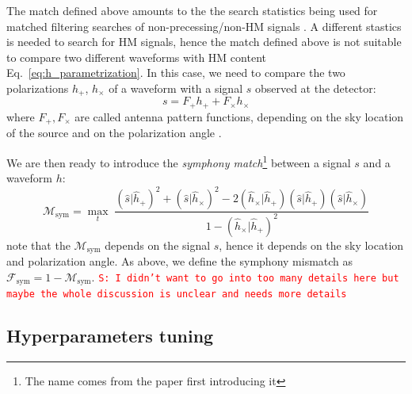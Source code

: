 \documentclass[twocolumn,showpacs,preprintnumbers,nofootinbib,prd,
superscriptaddress,10pt]{revtex4-1}
\newcommand{\rescalar}[2]{( #1 |#2 )}
\newcommand{\stefano}[1]{{\textcolor{red}{\texttt{S: #1}} }}
\begin{document}
The match defined above amounts to the the search statistics being used for matched filtering searches of non-precessing/non-HM signals \cite{}.
A different stastics is needed to search for HM signals, hence the match defined above is not suitable to compare two different waveforms with HM content Eq.~\eqref{eq:h_parametrization}.
In this case, we need to compare the two polarizations $h_+$, $h_\times$ of a waveform with a signal $s$ observed at the detector:
\begin{equation}
	s = F_+ h_+ + F_\times h_\times
\end{equation}
where $F_+, F_\times$ are called antenna pattern functions, depending on the sky location of the source and on the polarization angle \cite{}.

We are then ready to introduce the {\it symphony match}\footnote{The name comes from the paper \cite{} first introducing it} between a signal $s$ and a waveform $h$:
\begin{equation}\label{eq:match_sym}
	\mathcal{M}_\mathrm{sym} = \max_t \;
		\frac{ \rescalar{\hat{s}}{\hat{h}_+}^2 + \rescalar{\hat{s}}{\hat{h}_\times}^2 - 2 \rescalar{\hat{h}_\times}{\hat{h}_+} \rescalar{\hat{s}}{\hat{h}_+} \rescalar{\hat{s}}{\hat{h}_\times}}
		{1-\rescalar{\hat{h}_\times}{\hat{h}_+}^2}
\end{equation}
note that the $\mathcal{M}_\mathrm{sym}$ depends on the signal $s$, hence it depends on the sky location and polarization angle.
As above, we define the symphony mismatch as $\mathcal{F}_\mathrm{sym} = 1 - \mathcal{M}_\mathrm{sym}$.
\stefano{I didn't want to go into too many details here but maybe the whole discussion is unclear and needs more details}

\subsection{Hyperparameters tuning}
\label{sec:hyperparameter}
\end{document}
